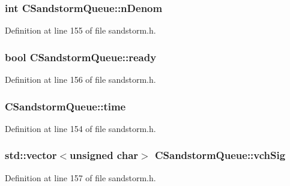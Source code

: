\subsubsection[{n\+Denom}]{\setlength{\rightskip}{0pt plus 5cm}int C\+Sandstorm\+Queue\+::n\+Denom}\label{class_c_sandstorm_queue_ab309d93e75dc503f0d9c8f44bc7e490a}


Definition at line 155 of file sandstorm.\+h.

\hypertarget{class_c_sandstorm_queue_a3a372c1d7da3e28a15c8c9e459fed163}{}
\subsubsection[{ready}]{\setlength{\rightskip}{0pt plus 5cm}bool C\+Sandstorm\+Queue\+::ready}\label{class_c_sandstorm_queue_a3a372c1d7da3e28a15c8c9e459fed163}


Definition at line 156 of file sandstorm.\+h.

\hypertarget{class_c_sandstorm_queue_a46297b8931f426f3069822fb952c6566}{}
\subsubsection[{time}]{ C\+Sandstorm\+Queue\+::time}\label{class_c_sandstorm_queue_a46297b8931f426f3069822fb952c6566}


Definition at line 154 of file sandstorm.\+h.

\hypertarget{class_c_sandstorm_queue_a3c1c68afe6fe851da5f14d3fa557e249}{}
\subsubsection[{vch\+Sig}]{\setlength{\rightskip}{0pt plus 5cm}std\+::vector$<$unsigned char$>$ C\+Sandstorm\+Queue\+::vch\+Sig}\label{class_c_sandstorm_queue_a3c1c68afe6fe851da5f14d3fa557e249}


Definition at line 157 of file sandstorm.\+h.

\hypertarget{class_c_sandstorm_queue_a4c2e9dc92126c22f8c095577d0f8782e}{}

